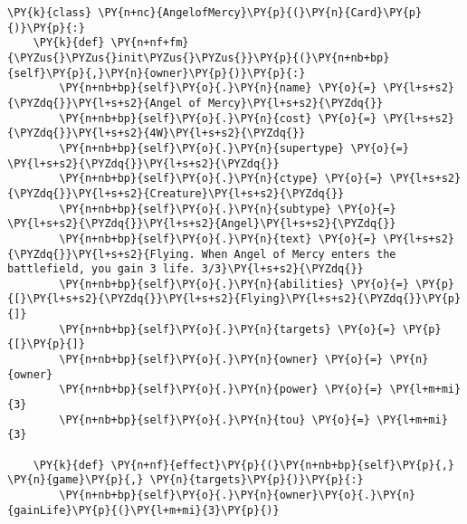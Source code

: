 
\begin{Verbatim}[commandchars=\\\{\}]
\PY{k}{class} \PY{n+nc}{AngelofMercy}\PY{p}{(}\PY{n}{Card}\PY{p}{)}\PY{p}{:}
    \PY{k}{def} \PY{n+nf+fm}{\PYZus{}\PYZus{}init\PYZus{}\PYZus{}}\PY{p}{(}\PY{n+nb+bp}{self}\PY{p}{,}\PY{n}{owner}\PY{p}{)}\PY{p}{:}
        \PY{n+nb+bp}{self}\PY{o}{.}\PY{n}{name} \PY{o}{=} \PY{l+s+s2}{\PYZdq{}}\PY{l+s+s2}{Angel of Mercy}\PY{l+s+s2}{\PYZdq{}}
        \PY{n+nb+bp}{self}\PY{o}{.}\PY{n}{cost} \PY{o}{=} \PY{l+s+s2}{\PYZdq{}}\PY{l+s+s2}{4W}\PY{l+s+s2}{\PYZdq{}}
        \PY{n+nb+bp}{self}\PY{o}{.}\PY{n}{supertype} \PY{o}{=} \PY{l+s+s2}{\PYZdq{}}\PY{l+s+s2}{\PYZdq{}}
        \PY{n+nb+bp}{self}\PY{o}{.}\PY{n}{ctype} \PY{o}{=} \PY{l+s+s2}{\PYZdq{}}\PY{l+s+s2}{Creature}\PY{l+s+s2}{\PYZdq{}}
        \PY{n+nb+bp}{self}\PY{o}{.}\PY{n}{subtype} \PY{o}{=} \PY{l+s+s2}{\PYZdq{}}\PY{l+s+s2}{Angel}\PY{l+s+s2}{\PYZdq{}}
        \PY{n+nb+bp}{self}\PY{o}{.}\PY{n}{text} \PY{o}{=} \PY{l+s+s2}{\PYZdq{}}\PY{l+s+s2}{Flying. When Angel of Mercy enters the battlefield, you gain 3 life. 3/3}\PY{l+s+s2}{\PYZdq{}}
        \PY{n+nb+bp}{self}\PY{o}{.}\PY{n}{abilities} \PY{o}{=} \PY{p}{[}\PY{l+s+s2}{\PYZdq{}}\PY{l+s+s2}{Flying}\PY{l+s+s2}{\PYZdq{}}\PY{p}{]}
        \PY{n+nb+bp}{self}\PY{o}{.}\PY{n}{targets} \PY{o}{=} \PY{p}{[}\PY{p}{]}
        \PY{n+nb+bp}{self}\PY{o}{.}\PY{n}{owner} \PY{o}{=} \PY{n}{owner}
        \PY{n+nb+bp}{self}\PY{o}{.}\PY{n}{power} \PY{o}{=} \PY{l+m+mi}{3}
        \PY{n+nb+bp}{self}\PY{o}{.}\PY{n}{tou} \PY{o}{=} \PY{l+m+mi}{3}

    \PY{k}{def} \PY{n+nf}{effect}\PY{p}{(}\PY{n+nb+bp}{self}\PY{p}{,} \PY{n}{game}\PY{p}{,} \PY{n}{targets}\PY{p}{)}\PY{p}{:}
        \PY{n+nb+bp}{self}\PY{o}{.}\PY{n}{owner}\PY{o}{.}\PY{n}{gainLife}\PY{p}{(}\PY{l+m+mi}{3}\PY{p}{)}
\end{Verbatim}
